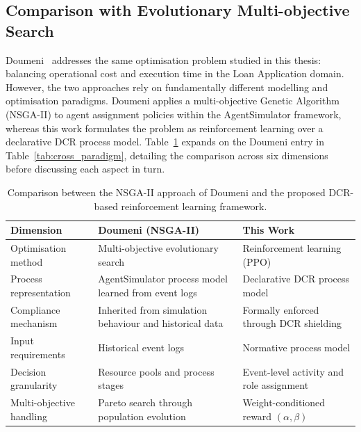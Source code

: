 \subsection{Comparison with Evolutionary Multi-objective Search}
\label{sec:discussion_doumeni}

Doumeni~\cite{ArtemisDoumeniParetoAgentSimulator} addresses the same optimisation problem studied in this thesis: balancing operational cost and execution time in the Loan Application domain. However, the two approaches rely on fundamentally different modelling and optimisation paradigms. Doumeni applies a multi-objective Genetic Algorithm (NSGA-II) to agent assignment policies within the AgentSimulator framework, whereas this work formulates the problem as reinforcement learning over a declarative \ac{DCR} process model. Table~\ref{tab:doumeni_comparison} expands on the Doumeni entry in Table~\ref{tab:cross_paradigm}, detailing the comparison across six dimensions before discussing each aspect in turn.

\begin{table}[H]
\centering
\caption{Comparison between the NSGA-II approach of Doumeni and the proposed DCR-based reinforcement learning framework.}
\label{tab:doumeni_comparison}

\renewcommand{\arraystretch}{1.1}
\setlength{\tabcolsep}{6pt} %

\begin{tabularx}{\linewidth}{l p{4.2cm} p{4.2cm}}
\toprule
\textbf{Dimension} & \textbf{Doumeni (NSGA-II)} & \textbf{This Work} \\
\midrule

Optimisation method &
Multi-objective evolutionary search &
Reinforcement learning (PPO) \\

Process representation &
AgentSimulator process model learned from event logs &
Declarative DCR process model \\

Compliance mechanism &
Inherited from simulation behaviour and historical data &
Formally enforced through DCR shielding \\

Input requirements &
Historical event logs &
Normative process model \\

Decision granularity &
Resource pools and process stages &
Event-level activity and role assignment \\

Multi-objective handling &
Pareto search through population evolution &
Weight-conditioned reward $(\alpha,\beta)$ \\

\bottomrule
\end{tabularx}
\end{table}

